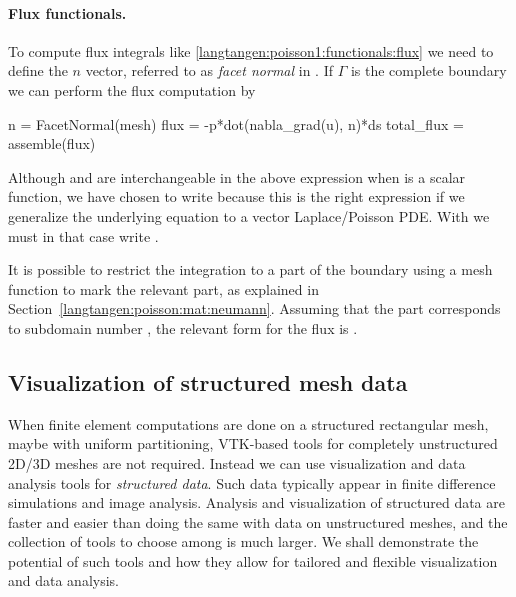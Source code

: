 \paragraph{Flux functionals.}
To compute flux integrals like
\eqref{langtangen:poisson1:functionals:flux} we need to define the
$n$ vector, referred to as \emph{facet normal} in
\fenics. If $\Gamma$ is the complete boundary we can perform the flux
computation by
\begin{python}
n = FacetNormal(mesh)
flux = -p*dot(nabla_grad(u), n)*ds
total_flux = assemble(flux)
\end{python}
Although  and  are interchangeable
in the above expression when  is a scalar function, we have
chosen to write  because this is
the right expression if we generalize the underlying equation
to a vector Laplace/Poisson PDE. With  we must in that
case write .

It is possible to restrict the integration to a part of the boundary
using a mesh function to mark the relevant part, as explained in
Section~\ref{langtangen:poisson:mat:neumann}. Assuming that the part
corresponds to subdomain number , the relevant form for the flux
is .

\subsection{Visualization of structured mesh data}
\label{langtangen:structviz}

When finite element computations are done on a structured rectangular
mesh, maybe with uniform partitioning, VTK-based tools for completely
unstructured 2D/3D meshes are not required.  Instead we can use
visualization and data analysis tools for \emph{structured
  data}. Such data typically appear in finite difference simulations and
image analysis.  Analysis and visualization of structured data are faster
and easier than doing the same with data on unstructured meshes, and
the collection of tools to choose among is much larger.  We shall
demonstrate the potential of such tools and how they allow for
tailored and flexible visualization and data analysis.

